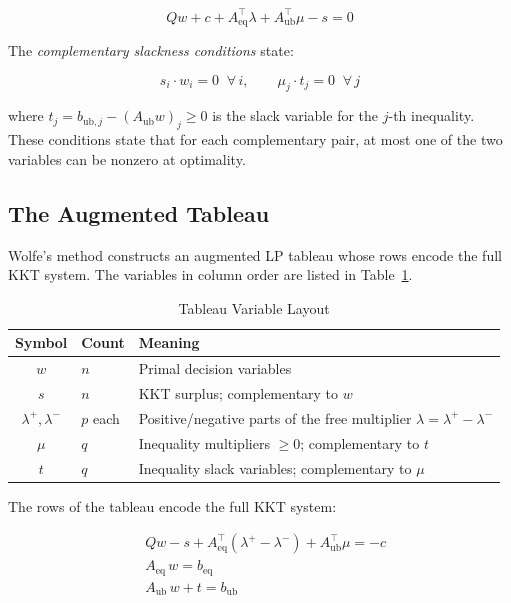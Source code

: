 \documentclass[conference]{IEEEtran}
\begin{document}
\begin{equation}
    Qw + c + A_{\text{eq}}^\top \lambda + A_{\text{ub}}^\top \mu - s = 0
    \label{eq:stationarity}
\end{equation}

The \textit{complementary slackness conditions} state:

\begin{equation}
    s_i \cdot w_i = 0 \;\; \forall\, i, \qquad
    \mu_j \cdot t_j = 0 \;\; \forall\, j
    \label{eq:complementarity}
\end{equation}

where $t_j = b_{\text{ub},j} - (A_{\text{ub}} w)_j \geq 0$ is the slack
variable for the $j$-th inequality. These conditions state that for each
complementary pair, at most one of the two variables can be nonzero at
optimality.

\subsection{The Augmented Tableau}

Wolfe's method constructs an augmented LP tableau whose rows encode the full
KKT system. The variables in column order are listed in Table~\ref{tab:vars}.

\begin{table}[h]
    \centering
    \caption{Tableau Variable Layout}
    \label{tab:vars}
    \begin{tabular}{clp{4.5cm}}
        \toprule
        \textbf{Symbol} & \textbf{Count} & \textbf{Meaning} \\
        \midrule
        $w$               & $n$      & Primal decision variables \\
        $s$               & $n$      & KKT surplus; complementary to $w$ \\
        $\lambda^+,\lambda^-$ & $p$ each & Positive/negative parts of the free multiplier $\lambda = \lambda^+ - \lambda^-$ \\
        $\mu$             & $q$      & Inequality multipliers $\geq 0$; complementary to $t$ \\
        $t$               & $q$      & Inequality slack variables; complementary to $\mu$ \\
        \bottomrule
    \end{tabular}
\end{table}

The rows of the tableau encode the full KKT system:

\begin{align}
    &Qw - s + A_{\text{eq}}^\top(\lambda^+ - \lambda^-) + A_{\text{ub}}^\top \mu = -c
    \label{eq:tableau_stat} \\[4pt]
    &A_{\text{eq}}\, w = b_{\text{eq}}
    \label{eq:tableau_eq} \\[4pt]
    &A_{\text{ub}}\, w + t = b_{\text{ub}}
    \label{eq:tableau_ineq}
\end{align}
\end{document}
